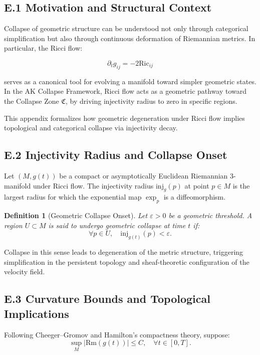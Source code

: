 \documentclass[11pt]{article}
\newtheorem{definition}[theorem]{Definition}
\begin{document}
\subsection{E.1 Motivation and Structural Context}

Collapse of geometric structure can be understood not only through categorical simplification but also through continuous deformation of Riemannian metrics. In particular, the Ricci flow:

\[
\partial_t g_{ij} = -2 \mathrm{Ric}_{ij}
\]

serves as a canonical tool for evolving a manifold toward simpler geometric states. In the AK Collapse Framework, Ricci flow acts as a geometric pathway toward the Collapse Zone \( \mathfrak{C} \), by driving injectivity radius to zero in specific regions.

This appendix formalizes how geometric degeneration under Ricci flow implies topological and categorical collapse via injectivity decay.

\subsection{E.2 Injectivity Radius and Collapse Onset}

Let \( (M, g(t)) \) be a compact or asymptotically Euclidean Riemannian 3-manifold under Ricci flow. The injectivity radius \( \mathrm{inj}_g(p) \) at point \( p \in M \) is the largest radius for which the exponential map \( \exp_p \) is a diffeomorphism.

\begin{definition}[Geometric Collapse Onset]
Let \( \varepsilon > 0 \) be a geometric threshold. A region \( U \subset M \) is said to undergo geometric collapse at time \( t \) if:
\[
\forall p \in U, \quad \mathrm{inj}_{g(t)}(p) < \varepsilon.
\]
\end{definition}

Collapse in this sense leads to degeneration of the metric structure, triggering simplification in the persistent topology and sheaf-theoretic configuration of the velocity field.

\subsection{E.3 Curvature Bounds and Topological Implications}

Following Cheeger–Gromov and Hamilton's compactness theory, suppose:
\[
\sup_{M} |\mathrm{Rm}(g(t))| \leq C, \quad \forall t \in [0,T].
\]
\end{document}
